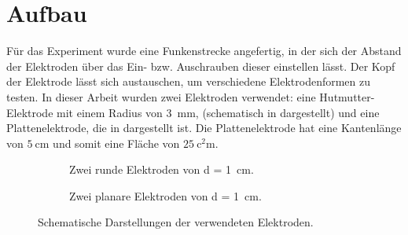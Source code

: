 \section{Aufbau}
\label{sec:setup}
Für das Experiment wurde eine Funkenstrecke angefertig, in der sich der Abstand der Elektroden über das Ein- bzw. Auschrauben dieser einstellen lässt. Der Kopf der Elektrode lässt sich austauschen, um verschiedene Elektrodenformen zu testen. In dieser Arbeit wurden zwei Elektroden verwendet: eine Hutmutter-Elektrode mit einem Radius von \SI{3}{\milli\meter}, (schematisch in  dargestellt) und eine Plattenelektrode, die in  dargestellt ist. Die Plattenelektrode hat eine Kantenlänge von \(\SI{5}{\centi\meter}\) und somit eine Fläche von \(\SI{25}{\square\centi\meter}\).

\begin{figure}[H]
    \centering
    \begin{subfigure}{0.45\textwidth}
        \centering
        
        \caption{Zwei runde Elektroden von d = \SI{1}{\centi\metre}.}
        \label{fig:setup_electrodes}
    \end{subfigure}
    \hfill
    \begin{subfigure}{0.45\textwidth}
        \centering
        
        \caption{Zwei planare Elektroden von d = \SI{1}{\centi\metre}.}
        \label{fig:setup_plate_electrodes}
    \end{subfigure}
    \caption{Schematische Darstellungen der verwendeten Elektroden.}
    \label{fig:setup_electrodes_combined}
\end{figure}
